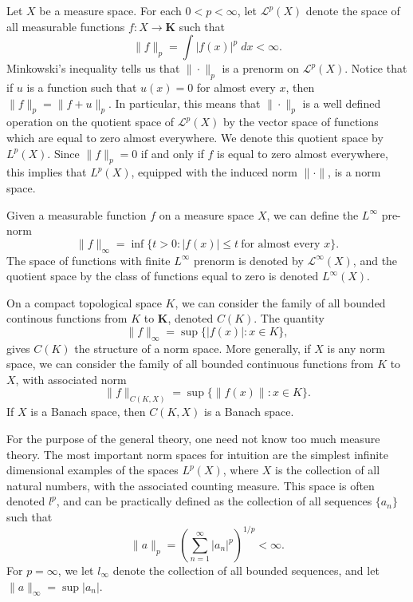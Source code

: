 \begin{example}
    Let $X$ be a measure space. For each $0 < p < \infty$, let $\mathcal{L}^p(X)$ denote the space of all measurable functions $f: X \to \mathbf{K}$ such that
    \[ \| f \|_p = \int |f(x)|^p\; dx < \infty. \]
    Minkowski's inequality tells us that $\| \cdot \|_p$ is a prenorm on $\mathcal{L}^p(X)$. Notice that if $u$ is a function such that $u(x) = 0$ for almost every $x$, then $\| f \|_p = \| f + u \|_p$. In particular, this means that $\| \cdot \|_p$ is a well defined operation on the quotient space of $\mathcal{L}^p(X)$ by the vector space of functions which are equal to zero almost everywhere. We denote this quotient space by $L^p(X)$. Since $\| f \|_p = 0$ if and only if $f$ is equal to zero almost everywhere, this implies that $L^p(X)$, equipped with the induced norm $\| \cdot \|$, is a norm space.
\end{example}

\begin{example}
    Given a measurable function $f$ on a measure space $X$, we can define the $L^\infty$ pre-norm
    \[ \| f \|_\infty = \inf \{ t > 0: |f(x)| \leq t\ \text{for almost every $x$} \}. \]
    The space of functions with finite $L^\infty$ prenorm is denoted by $\mathcal{L}^\infty(X)$, and the quotient space by the class of functions equal to zero is denoted $L^\infty(X)$.
\end{example}

\begin{example}
    On a compact topological space $K$, we can consider the family of all bounded continous functions from $K$ to $\mathbf{K}$, denoted $C(K)$. The quantity
    \[ \| f \|_\infty = \sup \{ |f(x)|: x \in K \}, \]
    gives $C(K)$ the structure of a norm space. More generally, if $X$ is any norm space, we can consider the family of all bounded continuous functions from $K$ to $X$, with associated norm
    \[ \| f \|_{C(K,X)} = \sup \{ \| f(x) \|: x \in K \}. \]
    If $X$ is a Banach space, then $C(K,X)$ is a Banach space.
\end{example}

For the purpose of the general theory, one need not know too much measure theory. The most important norm spaces for intuition are the simplest infinite dimensional examples of the spaces $L^p(X)$, where $X$ is the collection of all natural numbers, with the associated counting measure. This space is often denoted $l^p$, and can be practically defined as the collection of all sequences $\{ a_n \}$ such that
%
\[ \| a \|_p = \left( \sum_{n = 1}^\infty |a_n|^p \right)^{1/p} < \infty. \]
%
For $p = \infty$, we let $l_\infty$ denote the collection of all bounded sequences, and let $\| a \|_\infty = \sup |a_n|$.

